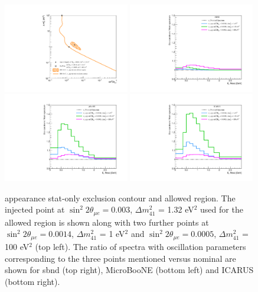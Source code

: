 \begin{figure}[h!]
    \centering
    \includegraphics[width = 0.49\textwidth, height = 0.47\textwidth]{figures-chap6/overlays/nue_app_stat_osc_markers.pdf}
    \includegraphics[width = 0.49\textwidth]{figures-chap6/spectra/nue_app_spectra_ratio_sbnd.pdf}
    \includegraphics[width = 0.49\textwidth]{figures-chap6/spectra/nue_app_spectra_ratio_uboone.pdf}
    \includegraphics[width = 0.49\textwidth]{figures-chap6/spectra/nue_app_spectra_ratio_icarus.pdf}
    \caption[Ratio of \nue appearance spectra with the oscillation parameters shown on the statistical only contour.]{\nue appearance stat-only exclusion contour and allowed region. The injected point at $\sin^2{2\theta_{\mu e}} = 0.003$, $\Delta m^2_{41}$ = 1.32 eV$^2$ used for the allowed region is shown along with two further points at $\sin^2{2\theta_{\mu e}} = 0.0014$, $\Delta m^2_{41}$ = 1 eV$^2$ and   $\sin^2{2\theta_{\mu e}} = 0.0005$, $\Delta m^2_{41}$ = 100 eV$^2$ (top left). The ratio of spectra with oscillation parameters corresponding to the three points mentioned versus nominal are shown for sbnd (top right), MicroBooNE (bottom left) and ICARUS (bottom right).}
    \label{fig:Nue_app_spectra_ratios}
\end{figure}


